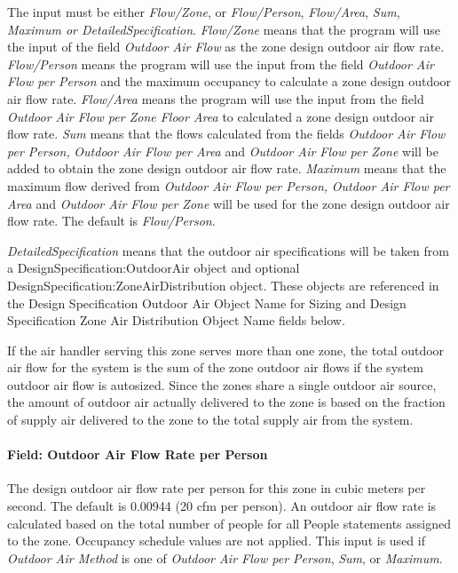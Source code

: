 The input must be either \emph{Flow/Zone}, or \emph{Flow/Person}, \emph{Flow/Area}, \emph{Sum}, \emph{Maximum or DetailedSpecification}. \emph{Flow/Zone} means that the program will use the input of the field \emph{Outdoor Air Flow} as the zone design outdoor air flow rate. \emph{Flow/Person} means the program will use the input from the field \emph{Outdoor Air Flow per Person} and the maximum occupancy to calculate a zone design outdoor air flow rate. \emph{Flow/Area} means the program will use the input from the field \emph{Outdoor Air Flow per Zone Floor Area} to calculated a zone design outdoor air flow rate. \emph{Sum} means that the flows calculated from the fields \emph{Outdoor Air Flow per Person,} \emph{Outdoor Air Flow per Area} and \emph{Outdoor Air Flow per Zone} will be added to obtain the zone design outdoor air flow rate. \emph{Maximum} means that the maximum flow derived from \emph{Outdoor Air Flow per Person,} \emph{Outdoor Air Flow per Area} and \emph{Outdoor Air Flow per Zone} will be used for the zone design outdoor air flow rate. The default is \emph{Flow/Person}.

\emph{DetailedSpecification} means that the outdoor air specifications will be taken from a DesignSpecification:OutdoorAir object and optional DesignSpecification:ZoneAirDistribution object. These objects are referenced in the Design Specification Outdoor Air Object Name for Sizing and Design Specification Zone Air Distribution Object Name fields below.

If the air handler serving this zone serves more than one zone, the total outdoor air flow for the system is the sum of the zone outdoor air flows if the system outdoor air flow is autosized. Since the zones share a single outdoor air source, the amount of outdoor air actually delivered to the zone is based on the fraction of supply air delivered to the zone to the total supply air from the system.

\paragraph{Field: Outdoor Air Flow Rate per Person}\label{field-outdoor-air-flow-rate-per-person-8}

The design outdoor air flow rate per person for this zone in cubic meters per second. The default is 0.00944 (20 cfm per person). An outdoor air flow rate is calculated based on the total number of people for all People statements assigned to the zone. Occupancy schedule values are not applied. This input is used if \emph{Outdoor Air Method} is one of \emph{Outdoor Air Flow per Person}, \emph{Sum}, or \emph{Maximum}.

